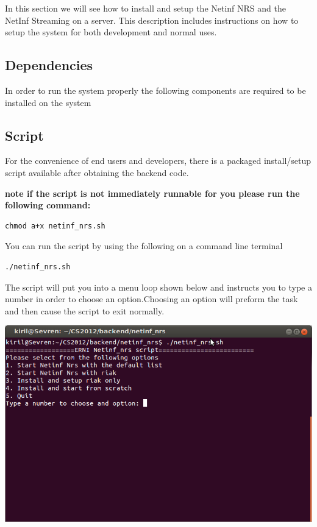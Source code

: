 In this section we will see how to install and setup the Netinf NRS and the NetInf Streaming on a server.
This description includes instructions on how to setup the system for both development and normal uses.

\subsection{Dependencies}

In order to run the system properly the following components are required to be installed on the system




\subsection{Script}

For the convenience of end users and developers, there is a packaged install/setup script available after obtaining the backend code.

\textbf{note if the script is not immediately runnable for you please run the following command:}
\begin{verbatim}
chmod a+x netinf_nrs.sh
\end{verbatim}

You can run the script by using the following on a command line terminal

\begin{verbatim}
./netinf_nrs.sh
\end{verbatim}

The script will put you into a menu loop shown below and instructs you to type a number in order to choose an option.Choosing an option will preform the task and then cause the script to exit normally.

\includegraphics[scale=0.5]{./img/Backend_install_script.png}

